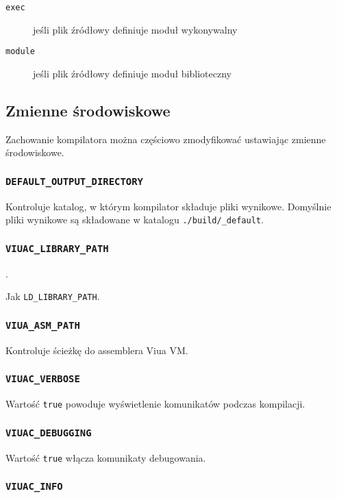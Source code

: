 \begin{description}
    \item[\texttt{exec}] jeśli plik źródłowy definiuje moduł wykonywalny
    \item[\texttt{module}] jeśli plik źródłowy definiuje moduł biblioteczny
\end{description}

\subsection{Zmienne środowiskowe}

Zachowanie kompilatora można częściowo zmodyfikować ustawiając zmienne środowiskowe.

\subsubsection{\texttt{DEFAULT\_OUTPUT\_DIRECTORY}}

Kontroluje katalog, w którym kompilator składuje pliki wynikowe. Domyślnie pliki wynikowe są składowane w
katalogu \texttt{./build/\_default}.

\subsubsection{\texttt{VIUAC\_LIBRARY\_PATH}}
\label{viuact_manual_env_viuac_library_path}.

Jak \texttt{LD\_LIBRARY\_PATH}.

\subsubsection{\texttt{VIUA\_ASM\_PATH}}

Kontroluje ścieżkę do assemblera Viua VM.

\subsubsection{\texttt{VIUAC\_VERBOSE}}

Wartość \texttt{true} powoduje wyświetlenie komunikatów podczas kompilacji.

\subsubsection{\texttt{VIUAC\_DEBUGGING}}

Wartość \texttt{true} włącza komunikaty debugowania.

\subsubsection{\texttt{VIUAC\_INFO}}

